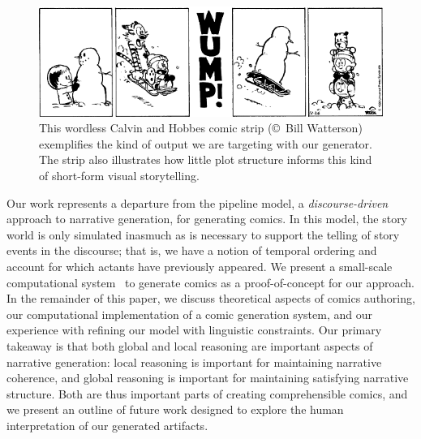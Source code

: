 \begin{figure}
\includegraphics[width=\columnwidth]{calvin-and-hobbes.png}
\caption{
This wordless Calvin and Hobbes comic strip ({\small \copyright}~Bill Watterson)
exemplifies the kind of output we are targeting with our generator. The strip also
illustrates how little plot structure informs this kind of short-form visual
storytelling.
}
\label{fig:calvin}
\end{figure}

Our work represents a departure from the pipeline model, a
\emph{discourse-driven} approach to narrative generation, for generating
comics. In this model, the story world is only simulated inasmuch as is
necessary to support the telling of story events in the discourse; that is,
we have a notion of temporal ordering and account for which actants have
previously appeared. We present a small-scale computational
system~\cite{montfort2012small} to generate comics as a proof-of-concept
for our approach.
%
In the remainder of this paper, we discuss theoretical aspects of comics
authoring, our computational implementation of a comic generation system,
and our experience with refining our model with linguistic constraints. Our
primary takeaway is that both global and local reasoning are important
aspects of narrative generation: local reasoning is important for
maintaining narrative coherence, and global reasoning is important for
maintaining satisfying narrative structure. Both are thus important parts
of creating comprehensible comics, and we present an outline of future work
designed to explore the human interpretation of our generated artifacts.

